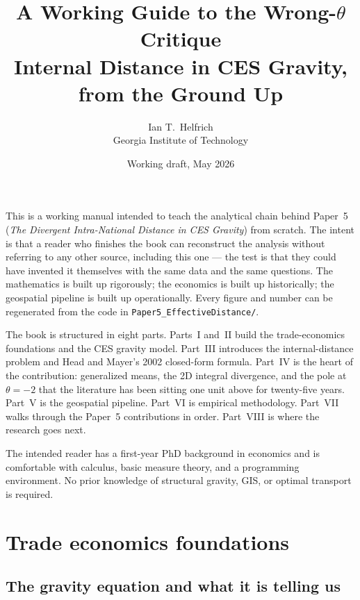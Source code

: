 \documentclass[11pt,letterpaper,oneside]{book}
\title{\sffamily\bfseries A Working Guide to the Wrong-$\theta$ Critique\\
       {\Large Internal Distance in CES Gravity, from the Ground Up}}
\author{Ian T.~Helfrich \\
        \small Georgia Institute of Technology}
\date{\small Working draft, May 2026}
\theoremstyle{definition}
\theoremstyle{remark}
\begin{document}
\frontmatter

\maketitle
\thispagestyle{empty}

\begin{tcolorbox}[nobox]
\sffamily\small\color{dim}
This is a working manual intended to teach the analytical chain behind Paper~5 (\emph{The Divergent Intra-National Distance in CES Gravity}) from scratch. The intent is that a reader who finishes the book can reconstruct the analysis without referring to any other source, including this one --- the test is that they could have invented it themselves with the same data and the same questions. The mathematics is built up rigorously; the economics is built up historically; the geospatial pipeline is built up operationally. Every figure and number can be regenerated from the code in \texttt{Paper5\_EffectiveDistance/}.

The book is structured in eight parts. Parts~I and~II build the trade-economics foundations and the CES gravity model. Part~III introduces the internal-distance problem and Head and Mayer's 2002 closed-form formula. Part~IV is the heart of the contribution: generalized means, the 2D integral divergence, and the pole at $\theta = -2$ that the literature has been sitting one unit above for twenty-five years. Part~V is the geospatial pipeline. Part~VI is empirical methodology. Part~VII walks through the Paper~5 contributions in order. Part~VIII is where the research goes next.

The intended reader has a first-year PhD background in economics and is comfortable with calculus, basic measure theory, and a programming environment. No prior knowledge of structural gravity, GIS, or optimal transport is required.
\end{tcolorbox}

\tableofcontents

\mainmatter

\part{Trade economics foundations}

\chapter{The gravity equation and what it is telling us}
\end{document}
